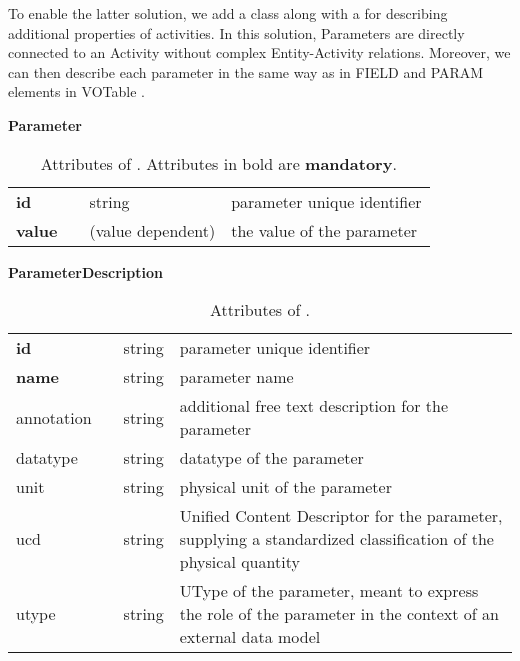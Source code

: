 To enable the latter solution, we add a  class along with a  for describing additional properties of activities. In this solution, Parameters are directly connected to an Activity without complex Entity-Activity relations. Moreover, we can then describe each parameter in the same way as in FIELD and PARAM elements in VOTable \citep{std:VOTable}.


\begin{table}[h]
\small
{}\textwidth
\textbf{\normalsize Parameter}\vspace{0.25em}\\
\begin{tabulary}{1.0\textwidth}{@{}p{0cm}p{2.5cm}lL@{}}
\toprule
{} & \head{} &  & \\
\midrule
\textbf{id}      & & string & parameter unique identifier\\
\textbf{value}   & & (value dependent) & the value of the parameter\\
\bottomrule
\end{tabulary}
\caption{Attributes of . Attributes in bold are \textbf{mandatory}.}
\end{table}

\begin{table}[ht]
\small
{}\textwidth
\textbf{\normalsize ParameterDescription}\vspace{0.25em}\\
\begin{tabulary}{1.0\textwidth}{@{}p{0cm}p{2.5cm}lL@{}}
\toprule
{} & \head{} &  & \\
\midrule
\textbf{id}  & & string & parameter unique identifier\\
\textbf{name} & & string & parameter name\\
annotation & & string & additional free text description for the parameter\\
datatype    & & string & datatype of the parameter \\
unit           & & string & physical unit of the parameter\\
ucd           & & string  & Unified Content Descriptor for the parameter, supplying a standardized classification of the physical quantity\\
utype        & & string  & UType of the parameter, meant to express the role of the parameter in the context of an external data model \\
\bottomrule
\end{tabulary}
\caption{Attributes of .}
\end{table}

